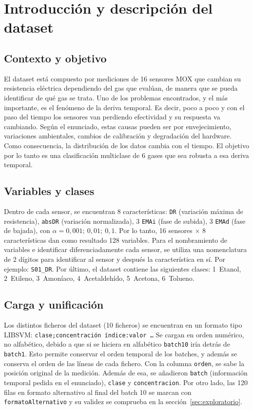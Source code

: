 \section{Introducción y descripción del dataset}
\label{sec:dataset}

\subsection{Contexto y objetivo}

El dataset está compuesto por mediciones de 16 sensores MOX que cambian su resistencia eléctrica
dependiendo del gas que evalúan, de manera que se pueda identificar de qué gas se trata. Uno de los
problemas encontrados, y el más importante, es el fenómeno de la deriva temporal. Es decir, poco a
poco y con el paso del tiempo los sensores van perdiendo efectividad y su respuesta va cambiando.
Según el enunciado, estas causas pueden ser por envejecimiento, variaciones ambientales, cambios de
calibración y degradación del hardware. Como consecuencia, la distribución de los datos cambia con
el tiempo. El objetivo por lo tanto es una clasificación multiclase de 6 gases que sea robusta a esa
deriva temporal.

\subsection{Variables y clases}

Dentro de cada sensor, se encuentran 8 características: \texttt{DR} (variación máxima de
resistencia), \texttt{absDR} (variación normalizada), 3 \texttt{EMAi} (fase de subida), 3
\texttt{EMAd} (fase de bajada), con $\alpha = 0{,}001;\ 0{,}01;\ 0{,}1$. Por lo tanto,
16 sensores $\times$ 8 características dan como resultado 128 variables. Para el nombramiento de
variables e identificar diferenciadamente cada sensor, se utiliza una nomenclatura de 2 dígitos para
identificar al sensor y después la característica en sí. Por ejemplo: \texttt{S01\_DR}. Por último,
el dataset contiene las siguientes clases: 1~Etanol, 2~Etileno, 3~Amoníaco, 4~Acetaldehído,
5~Acetona, 6~Tolueno.

\subsection{Carga y unificación}

Los distintos ficheros del dataset (10 ficheros) se encuentran en un formato tipo LIBSVM:
\texttt{clase;concentración índice:valor \dots} Se cargan en orden numérico, no alfabético, debido a
que si se hiciera en alfabético \texttt{batch10} iría detrás de \texttt{batch1}. Esto permite
conservar el orden temporal de los batches, y además se conserva el orden de las líneas de cada
fichero. Con la columna \texttt{orden}, se sabe la posición original de la medición. Además de esa,
se añadieron \texttt{batch} (información temporal pedida en el enunciado), \texttt{clase} y
\texttt{concentracion}. Por otro lado, las 120 filas en formato alternativo al final del batch 10 se
marcan con \texttt{formatoAlternativo} y su validez se comprueba en la
sección~\ref{sec:exploratorio}.

